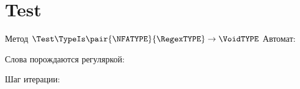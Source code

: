 \section{Test}
\begin{frame}{Метод $\Test\TypeIs\pair{\NFATYPE}{\RegexTYPE}\to\VoidTYPE$}
    Автомат:


    Слова порождаются регуляркой:

    Шаг итерации:


\end{frame}
